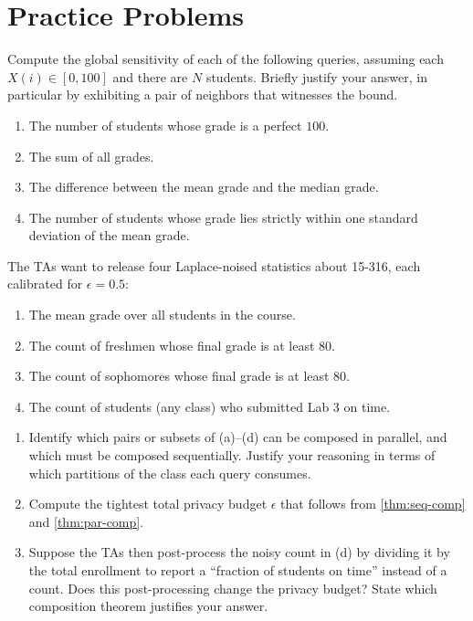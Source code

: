 \documentclass[11pt]{article}
\begin{document}
\section{Practice Problems}

\begin{task}\rm
  Compute the global sensitivity of each of the following queries, assuming
  each $X(i) \in [0, 100]$ and there are $N$ students.  Briefly justify your
  answer, in particular by exhibiting a pair of neighbors that witnesses the
  bound.
  \begin{enumerate}
  \item The number of students whose grade is a perfect $100$.
  \item The sum of all grades.
  \item The difference between the mean grade and the median grade.
  \item The number of students whose grade lies strictly within one standard
    deviation of the mean grade.
  \end{enumerate}
\end{task}

\begin{task}\rm
  The TAs want to release four Laplace-noised statistics about 15-316,
  each calibrated for $\epsilon = 0.5$:
  \begin{enumerate}
  \item[(a)] The mean grade over all students in the course.
  \item[(b)] The count of freshmen whose final grade is at least $80$.
  \item[(c)] The count of sophomores whose final grade is at least $80$.
  \item[(d)] The count of students (any class) who submitted Lab 3 on time.
  \end{enumerate}
  \begin{enumerate}
  \item Identify which pairs or subsets of (a)--(d) can be composed in
    parallel, and which must be composed sequentially.  Justify your
    reasoning in terms of which partitions of the class each query consumes.
  \item Compute the tightest total privacy budget $\epsilon$ that follows
    from \autoref{thm:seq-comp} and \autoref{thm:par-comp}.
  \item Suppose the TAs then post-process the noisy count in (d) by dividing
    it by the total enrollment to report a ``fraction of students on time''
    instead of a count.  Does this post-processing change the privacy
    budget?  State which composition theorem justifies your answer.
  \end{enumerate}
\end{task}



\end{document}
